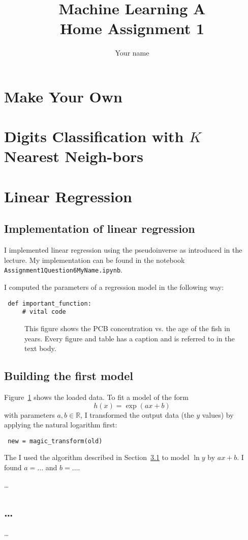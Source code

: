 \documentclass[a4paper,12pt]{article}
\begin{document}
\title{Machine Learning A\\Home Assignment 1}
\author{\color{red}Your name}
\date{}
\maketitle



\section{Make Your Own}



\section{Digits  Classification  with $K$ Nearest  Neigh-bors}




\section{Linear Regression}
\subsection{Implementation of linear regression}\label{sec:lr_imp}
I implemented linear regression using the pseudoinverse as introduced
in the lecture. My implementation can be found in the notebook
\texttt{Assignment1Question6MyName.ipynb}.

I computed the parameters of a regression model in the following way:
\begin{lstlisting}
 def important_function:
     # vital code
\end{lstlisting}



\begin{figure}
  \begin{center}
  \end{center}
  \caption{This figure shows the PCB concentration vs.{} the age of
    the fish in years.
    Every figure and table has a caption and is referred to 
    in the text body.\label{fig:q6p1}}
\end{figure}
\subsection{Building the first model}
Figure~\ref{fig:q6p1} shows the loaded data.
To fit a model of the form
\begin{equation*}
 h(x) = \exp(ax+b) 
 \end{equation*}
 with parameters $a,b\in\mathbb R$, I transformed the output data (the
 $y$ values) by applying the natural logarithm first:
\begin{lstlisting}
 new = magic_transform(old)
\end{lstlisting}
The I used the algorithm described in Section~\ref{sec:lr_imp}
to model $\ln y$ by $ax+b$.
I found $a=\dots$ and $b=\dots$.

\noindent\dots 
\subsection{\dots}
\dots 

\end{document}
